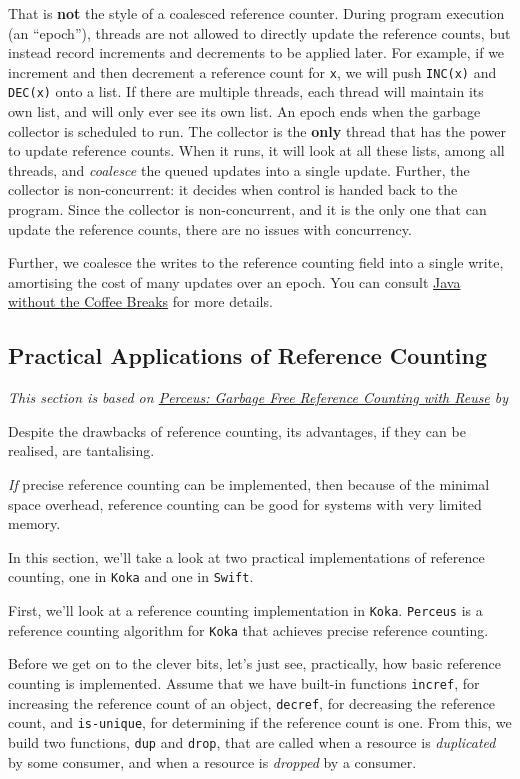 That is \textbf{not} the style of a coalesced reference counter. During program execution (an ``epoch''), threads are not allowed to directly update the reference counts, but instead record increments and decrements to be applied later. For example, if we increment and then decrement a reference count for \texttt{x}, we will push \texttt{INC(x)} and \texttt{DEC(x)} onto a list. If there are multiple threads, each thread will maintain its own list, and will only ever see its own list. An epoch ends when the garbage collector is scheduled to run. The collector is the \textbf{only} thread that has the power to update reference counts. When it runs, it will look at all these lists, among all threads, and \textit{coalesce} the queued updates into a single update. Further, the collector is non-concurrent: it decides when control is handed back to the program. Since the collector is non-concurrent, and it is the only one that can update the reference counts, there are no issues with concurrency. 

Further, we coalesce the writes to the reference counting field into a single write, amortising the cost of many updates over an epoch. You can consult \href{https://www.cs.purdue.edu/homes/hosking/690M/p92-bacon.pdf}{Java without the Coffee Breaks} for more details.

\subsection{Practical Applications of Reference Counting\optional}
\textit{This section is based on \href{https://www.microsoft.com/en-us/research/uploads/prod/2020/11/perceus-tr-v1.pdf}{Perceus: Garbage Free Reference Counting with Reuse} by} \citet{reinking-2021}

Despite the drawbacks of reference counting, its advantages, if they can be realised, are tantalising.

\textit{If} precise reference counting can be implemented, then because of the minimal space overhead, reference counting can be good for systems with very limited memory. 

In this section, we'll take a look at two practical implementations of reference counting, one in \texttt{Koka} and one in \texttt{Swift}. 

First, we'll look at a reference counting implementation in \texttt{Koka}. \texttt{Perceus} is a reference counting algorithm for \texttt{Koka} that achieves precise reference counting. 

Before we get on to the clever bits, let's just see, practically, how basic reference counting is implemented. Assume that we have built-in functions \texttt{incref}, for increasing the reference count of an object, \texttt{decref}, for decreasing the reference count, and \texttt{is-unique}, for determining if the reference count is one. From this, we build two functions, \texttt{dup} and \texttt{drop}, that are called when a resource is \textit{duplicated} by some consumer, and when a resource is \textit{dropped} by a consumer.


